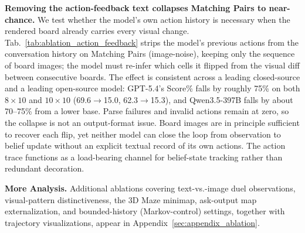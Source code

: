 


\noindent\textbf{Removing the action-feedback text collapses Matching Pairs to near-chance.}\label{sec:diag_action_feedback}
We test whether the model's own action history is necessary when the rendered board already carries every visual change. Tab.~\ref{tab:ablation_action_feedback} strips the model's previous actions from the conversation history on Matching Pairs (image-noise), keeping only the sequence of board images; the model must re-infer which cells it flipped from the visual diff between consecutive boards. The effect is consistent across a leading closed-source and a leading open-source model: GPT-5.4's Score\% falls by roughly 75\% on both $8{\times}10$ and $10{\times}10$ (69.6$\to$15.0, 62.3$\to$15.3), and Qwen3.5-397B falls by about 70--75\% from a lower base. Parse failures and invalid actions remain at zero, so the collapse is not an output-format issue. Board images are in principle sufficient to recover each flip, yet neither model can close the loop from observation to belief update without an explicit textual record of its own actions. The action trace functions as a load-bearing channel for belief-state tracking rather than redundant decoration.

\begin{table}[tbp]
\centering
\hfill

\end{table}

\noindent\textbf{More Analysis.} Additional ablations covering text-vs.-image duel observations, visual-pattern distinctiveness, the 3D Maze minimap, ask-output map externalization, and bounded-history (Markov-control) settings, together with trajectory visualizations, appear in Appendix~\ref{sec:appendix_ablation}.
